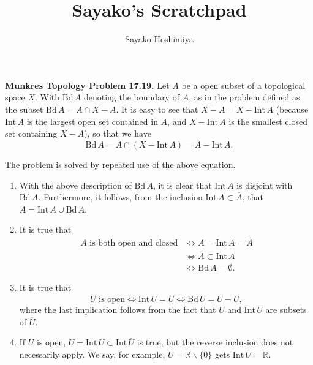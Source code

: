 \documentclass[10pt]{article}
\title{Sayako's Scratchpad}
\author{Sayako Hoshimiya}
\begin{document}
\begin{CJK*}{UTF8}{gbsn}
\maketitle
\renewcommand{\setminus}{\mathbin{\backslash}}
\def \setminus {\mathbin{\backslash}}
\textbf{Munkres Topology Problem 17.19.}
\newcommand{\Bd}{\text{Bd}\,}
\newcommand{\Int}{\text{Int}\,}
Let $A$ be a open subset of a topological space $X$. With $\Bd A$ denoting the boundary of $A$, as in the problem defined as the subset $\Bd A=A\cap X-A$. It is easy to see that $\overline{X-A}=X-\Int A$ (because $\Int A$ is the largest open set contained in $A$, and $X-\Int A$ is the smallest closed set containing $X-A$), so that we have
$$
\Bd A=\overline{A}\cap(X-\Int A)=\overline{A}-\Int A.
$$

The problem is solved by repeated use of the above equation.

\begin{enumerate}[label=(\alph*)]
\item With the above description of $\Bd A$, it is clear that $\Int A$ is disjoint with $\Bd A$. Furthermore, it follows, from the inclusion $\Int A\subset\overline{A}$, that $\overline{A}=\Int A\cup\Bd A$.

\item It is true that
\begin{align*}
A\text{ is both open and closed}&\iff A=\Int A=\overline{A}\\
&\iff\overline{A}\subset\Int A\\
&\iff\Bd A=\emptyset.
\end{align*}

\item It is true that
$$
U\text{ is open}\iff\Int U = U\iff\Bd U=\overline{U}-U,
$$
where the last implication follows from the fact that $U$ and $\Int U$ are subsets of $\overline{U}$.

\item If $U$ is open, $U=\Int U\subset\Int\overline{U}$ is true, but the reverse inclusion does not necessarily apply. We say, for example, $U=\mathbb{R}\setminus\{0\}$ gets $\Int\overline{U}=\mathbb{R}$.
\end{enumerate}


\end{CJK*}
\end{document}
